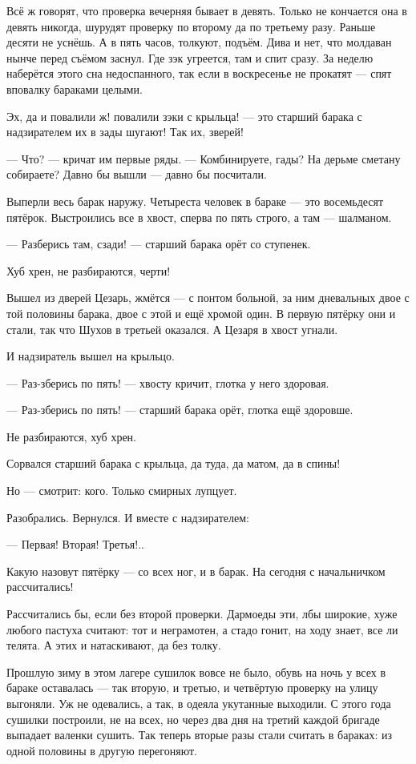 Всё ж говорят, что проверка вечерняя бывает в девять. Только не кончается она в девять никогда, шурудят проверку по второму да по третьему разу. Раньше десяти не уснёшь. А в пять часов, толкуют, подъём. Дива и нет, что молдаван нынче перед съёмом заснул. Где зэк угреется, там и спит сразу. За неделю наберётся этого сна недоспанного, так если в воскресенье не прокатят --- спят вповалку бараками целыми.

Эх, да и повалили ж! повалили зэки с крыльца! --- это старший барака с надзирателем их в зады шугают! Так их, зверей!

--- Что? --- кричат им первые ряды. --- Комбинируете, гады? На дерьме сметану собираете? Давно бы вышли --- давно бы посчитали.

Выперли весь барак наружу. Четыреста человек в бараке --- это восемьдесят пятёрок. Выстроились все в хвост, сперва по пять строго, а там --- шалманом.

--- Разберись там, сзади! --- старший барака орёт со ступенек.

Хуб хрен, не разбираются, черти!

Вышел из дверей Цезарь, жмётся --- с понтом больной, за ним дневальных двое с той половины барака, двое с этой и ещё хромой один. В первую пятёрку они и стали, так что Шухов в третьей оказался. А Цезаря в хвост угнали.

И надзиратель вышел на крыльцо.

--- Раз-зберись по пять! --- хвосту кричит, глотка у него здоровая.

--- Раз-зберись по пять! --- старший барака орёт, глотка ещё здоровше.

Не разбираются, хуб хрен.

Сорвался старший барака с крыльца, да туда, да матом, да в спины!

Но --- смотрит: кого. Только смирных лупцует.

Разобрались. Вернулся. И вместе с надзирателем:

--- Первая! Вторая! Третья!..

Какую назовут пятёрку --- со всех ног, и в барак. На сегодня с начальничком рассчитались!

Рассчитались бы, если без второй проверки. Дармоеды эти, лбы широкие, хуже любого пастуха считают: тот и неграмотен, а стадо гонит, на ходу знает, все ли телята. А этих и натаскивают, да без толку.

Прошлую зиму в этом лагере сушилок вовсе не было, обувь на ночь у всех в бараке оставалась --- так вторую, и третью, и четвёртую проверку на улицу выгоняли. Уж не одевались, а так, в одеяла укутанные выходили. С этого года сушилки построили, не на всех, но через два дня на третий каждой бригаде выпадает валенки сушить. Так теперь вторые разы стали считать в бараках: из одной половины в другую перегоняют.

